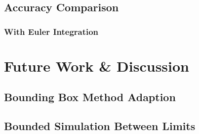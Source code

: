 	\subsection{Accuracy Comparison}

		\subsubsection{With Euler Integration}

\section{Future Work \& Discussion}

	\subsection{Bounding Box Method Adaption}

	\subsection{Bounded Simulation Between Limits}


